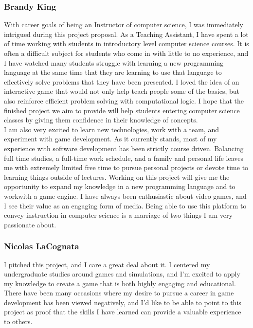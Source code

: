 \subsubsection{Brandy King}
With career goals of being an Instructor of computer science, I was immediately intrigued during this project proposal. As a Teaching Assistant, I have spent a lot of time working with students in introductory level computer science courses. It is often a difficult subject for students who come in with little to no experience, and I have watched many students struggle with learning a new programming language at the same time that they are learning to use that language to effectively solve problems that they have been presented. I loved
the idea of an interactive game that would not only help teach people some of the basics, but also reinforce efficient problem solving with computational logic. I hope that the finished project we aim to provide will help students entering computer science classes by giving them confidence in their knowledge of concepts.\\

I am also very excited to learn new technologies, work with a team, and experiment with game development. As it currently stands, most of my experience with software development has been strictly course driven. Balancing full time studies, a full-time work schedule, and a family and personal life leaves me with extremely limited free time to pursue personal projects or devote time to learning things outside of lectures. Working on this project will give me the opportunity to expand my knowledge in a new programming language and to workwith a game engine. I have always been enthusiastic about video games, and I see their value as an engaging form of media. Being able to use this platform to convey instruction in computer science is a marriage of two things I am very passionate about.\\

\subsubsection{Nicolas LaCognata}
I pitched this project, and I care a great deal about it. I centered my undergraduate studies around games and simulations, and I’m excited to apply my knowledge to create a game that is both highly engaging and educational. There have been many occasions where my desire to pursue a career in game development has been viewed negatively, and I’d like to be able to point to this project as proof that the skills I have learned can provide a valuable experience to others.\\


